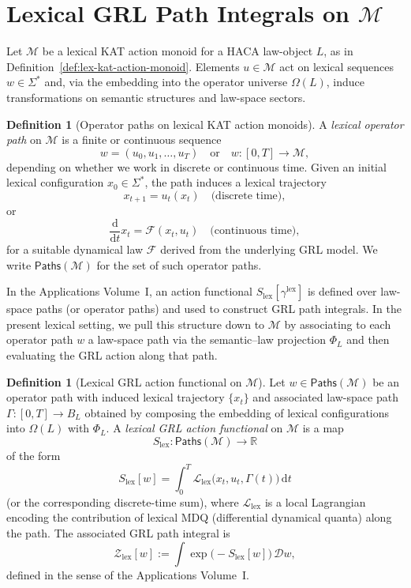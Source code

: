 \documentclass[11pt]{book}
\theoremstyle{plain}
\theoremstyle{definition}
\newtheorem{definition}[theorem]{Definition}
\theoremstyle{remark}
\begin{document}
\section[Lexical GRL Path Integrals on \texorpdfstring{$\mathcal{M}$}{M}]{Lexical GRL Path Integrals on \texorpdfstring{$\mathcal{M}$}{M}}


Let $\mathcal{M}$ be a lexical KAT action monoid for a HACA law-object
$L$, as in Definition~\ref{def:lex-kat-action-monoid}. Elements
$u\in\mathcal{M}$ act on lexical sequences $w\in\Sigma^*$ and, via the
embedding into the operator universe $\Omega(L)$, induce transformations
on semantic structures and law-space sectors.

\begin{definition}[Operator paths on lexical KAT action monoids]
\label{def:operator-paths-on-M}
A \emph{lexical operator path} on $\mathcal{M}$ is a finite or
continuous sequence
\[
  w = (u_0,u_1,\dots,u_T)
  \quad\text{or}\quad
  w:[0,T]\to\mathcal{M},
\]
depending on whether we work in discrete or continuous time. Given an
initial lexical configuration $x_0\in\Sigma^*$, the path induces a
lexical trajectory
\[
  x_{t+1} = u_t(x_t)
  \quad\text{(discrete time)},
\]
or
\[
  \frac{\mathrm{d}}{\mathrm{d}t}x_t
  = \mathcal{F}(x_t,u_t)
  \quad\text{(continuous time)},
\]
for a suitable dynamical law $\mathcal{F}$ derived from the underlying
GRL model. We write $\mathsf{Paths}(\mathcal{M})$ for the set of such
operator paths.
\end{definition}

In the Applications Volume~I, an action functional
$S_{\mathrm{lex}}[\gamma^{\mathrm{lex}}]$ is defined over law-space
paths (or operator paths) and used to construct GRL path integrals. In
the present lexical setting, we pull this structure down to
$\mathcal{M}$ by associating to each operator path $w$ a law-space
path via the semantic--law projection $\Phi_L$ and then evaluating the
GRL action along that path.

\begin{definition}[Lexical GRL action functional on \texorpdfstring{$\mathcal{M}$}{M}]
\label{def:lexical-grl-action-on-M}
Let $w\in\mathsf{Paths}(\mathcal{M})$ be an operator path with induced
lexical trajectory $\{x_t\}$ and associated law-space path
$\Gamma:[0,T]\to B_L$ obtained by composing the embedding of lexical
configurations into $\Omega(L)$ with $\Phi_L$. A \emph{lexical GRL
action functional} on $\mathcal{M}$ is a map
\[
  S_{\mathrm{lex}} : \mathsf{Paths}(\mathcal{M})\longrightarrow\mathbb{R}
\]
of the form
\[
  S_{\mathrm{lex}}[w]
  =
  \int_0^T \mathcal{L}_{\mathrm{lex}}\bigl(x_t,u_t,\Gamma(t)\bigr)\,\mathrm{d}t
\]
(or the corresponding discrete-time sum), where
$\mathcal{L}_{\mathrm{lex}}$ is a local Lagrangian encoding the
contribution of lexical MDQ (differential dynamical quanta) along the
path. The associated GRL path integral is
\[
  \mathcal{Z}_{\mathrm{lex}}[w]
  :=
  \int \exp\bigl(-S_{\mathrm{lex}}[w]\bigr)\,\mathcal{D}w,
\]
defined in the sense of the Applications Volume~I.
\end{definition}
\end{document}
